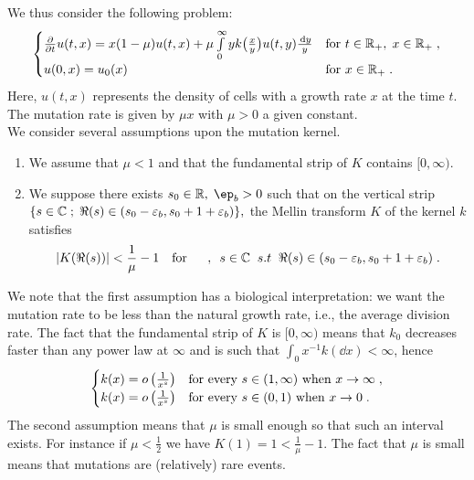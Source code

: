 We {\MD thus} consider the following problem:
\begin{equation}
    \begin{cases}
	\frac{\partial}{\partial t}u(t,x) = x(1-\mu) u(t,x) + \mu \int\limits_{0}^{\infty} y k\big( \frac{x}{y}\big) u(t,y) \frac{\, \mathrm dy}{y} 
	& \text{for }t \in \mathbb{R}_+, \; x \in \mathbb{R}_+ \; ,
	\\
	u(0, x) = u_0(x)
	& \text{for }x \in \mathbb{R}_+
	\; .
    \end{cases}
    \label{eq:linearmutrate}
\end{equation}
Here, $u(t,x)$ represents the density of cells with a growth rate $x$ at the time $t$. The mutation rate is given by $\mu x$ with $\mu>0$ a given constant. \\

We consider several assumptions upon the mutation kernel.
\begin{hypothesis}\label{hyp:boundK} \mbox{}
    \begin{enumerate}
        \item We assume that $\mu < 1$ and that the fundamental strip of $K$ contains $[0, \infty)$.  
        \item We suppose there exists {\MD $s_0\in \R,\;\ep_b>0$ such that on the} vertical strip $\{s \in \mathbb{C} \;;\; \Re(s) \in(s_0-\varepsilon_b, s_0+1+\varepsilon_b) \},$ {\MD the Mellin transform $K$ of the kernel $k$ satisfies}
        $$|K(\Re(s))| < \frac{1}{\mu} - 1
        \quad \text{for } \quad \; , \enspace s \in \mathbb{C} \;\; s.t \;\; \Re(s) \in(s_0-\varepsilon_b, s_0+1+\varepsilon_b)\; .$$ 
    \end{enumerate}
\end{hypothesis}
We note that the first assumption has a biological interpretation: we want the mutation {\MD rate} to be less than the natural growth {\MD rate, i.e., the average division rate}. The fact that the  fundamental strip of $K$ is $[0, \infty)$ means that $k_0$ decreases {\MD faster than any power law at $\infty$ and is such that $\int_0 x^{-1} k(\dd x) <\infty$, hence}
\begin{equation*}
    \begin{cases}
        k(x) = o\left( \frac{1}{x^s}\right) & \text{for every } s \in (1, \infty) \text{ when } x \to \infty \; ,\\
        k(x) = o\left( \frac{1}{x^s}\right) & \text{for every } s \in (0, 1) \text{ when } x \to 0 \; .
    \end{cases}
\end{equation*}
The second assumption means that $\mu$ is small enough so that  such an interval exists. For instance if $\mu<\frac{1}{2}$ we have $K(1)=1<\frac{1}{\mu}-1$. The fact that $\mu$ is small means that mutations are (relatively) rare events. \\


